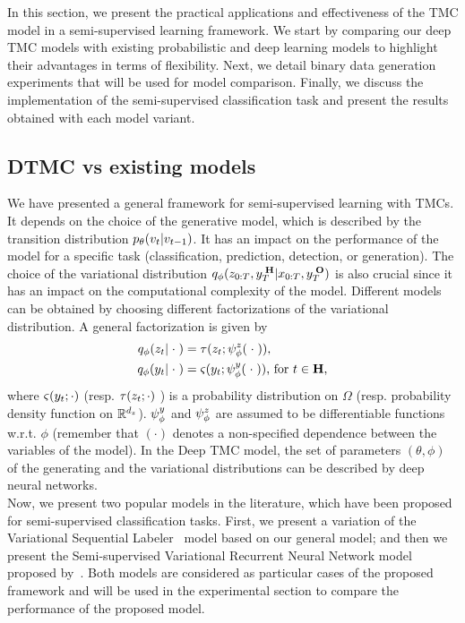 In this section, we present the practical applications and 
effectiveness of the TMC  model in a semi-supervised learning framework. We
start by comparing our deep TMC models with existing probabilistic and deep
learning models to highlight their advantages in terms of flexibility.
Next, we detail binary data generation experiments that will be used
for model comparison. Finally, we discuss the implementation of the semi-supervised 
classification task and present the results obtained with each model variant. 


\subsection{DTMC vs  existing models}
\label{subsec:particular_cases}
We have presented a general framework for semi-supervised learning
with TMCs. It depends on the choice of
the generative model, which is described by the transition distribution
$p_{\theta}({v}_t|{v}_{t-1})$. It
has an impact on the performance of the model 
for a specific task  
(classification, prediction, detection, or generation). 
The choice of the variational distribution  
$q_\phi(z_{0:T}, y_{T}^{\;\mathbf{H}}|x_{0:T}, y_{T}^{\;\mathbf{O}})$ is also crucial
since it has an impact on the computational complexity of the model.
Different models can be obtained by choosing different factorizations
of the variational distribution. A general factorization is given by
\begin{align*}
        q_\phi(z_t | \;\cdot\;) &=  \tau(z_t; \psi^{z}_{\phi} (\;\cdot \;)) \text{,}\\
        q_\phi(y_t | \;\cdot\;) &=  
        \varsigma(y_t;  \psi^{y}_{\phi}(\;\cdot\;)) \text{, for } t\in \mathbf{H}\text{,}
\end{align*}
where $\varsigma(y_t; \cdot )$ (resp. $\tau(z_t; \cdot )$ )
is a probability distribution on $\Omega$
(resp. probability density function on $\mathbb{R}^{d_z}$).
$\psi^{y}_{\phi}$ and $\psi^{z}_{\phi}$ are assumed to be differentiable functions w.r.t. $\phi$ 
(remember that $(\cdot)$ 
denotes a non-specified dependence between the variables of the model).
In the Deep TMC model, the set of parameters $(\theta, \phi)$  
of the generating  and the variational distributions 
can be described by deep neural networks.\\

Now, we present two popular models in the literature, 
which have been proposed for semi-supervised classification tasks.
First, we present a variation
of the Variational Sequential Labeler~\citep{chen2019variational} model 
based on our general model;
and then we present the
Semi-supervised Variational Recurrent Neural Network model
proposed by~\cite{butepage2019predicting}.
Both models are considered as particular cases of the proposed framework
and will be used in the experimental section to compare 
the performance of the proposed model. 

